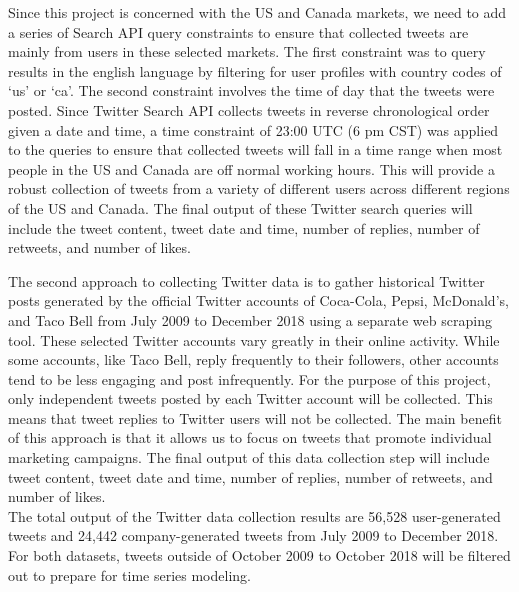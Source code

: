 \documentclass[12pt,oneside]{chicagocapstone}
\begin{document}
Since this project is concerned with the US and Canada markets, we need
to add a series of Search API query constraints to ensure that collected
tweets are mainly from users in these selected markets. The first
constraint was to query results in the english language by filtering for
user profiles with country codes of `us' or `ca'. The second constraint
involves the time of day that the tweets were posted. Since Twitter
Search API collects tweets in reverse chronological order given a date
and time, a time constraint of 23:00 UTC (6 pm CST) was applied to the
queries to ensure that collected tweets will fall in a time range when
most people in the US and Canada are off normal working hours. This will
provide a robust collection of tweets from a variety of different users
across different regions of the US and Canada. The final output of these
Twitter search queries will include the tweet content, tweet date and
time, number of replies, number of retweets, and number of likes.

The second approach to collecting Twitter data is to gather historical
Twitter posts generated by the official Twitter accounts of Coca-Cola,
Pepsi, McDonald's, and Taco Bell from July 2009 to December 2018 using a
separate web scraping tool. These selected Twitter accounts vary greatly
in their online activity. While some accounts, like Taco Bell, reply
frequently to their followers, other accounts tend to be less engaging
and post infrequently. For the purpose of this project, only independent
tweets posted by each Twitter account will be collected. This means that
tweet replies to Twitter users will not be collected. The main benefit
of this approach is that it allows us to focus on tweets that promote
individual marketing campaigns. The final output of this data collection
step will include tweet content, tweet date and time, number of replies,
number of retweets, and number of likes.\\
The total output of the Twitter data collection results are 56,528
user-generated tweets and 24,442 company-generated tweets from July 2009
to December 2018. For both datasets, tweets outside of October 2009 to
October 2018 will be filtered out to prepare for time series modeling.
\end{document}
